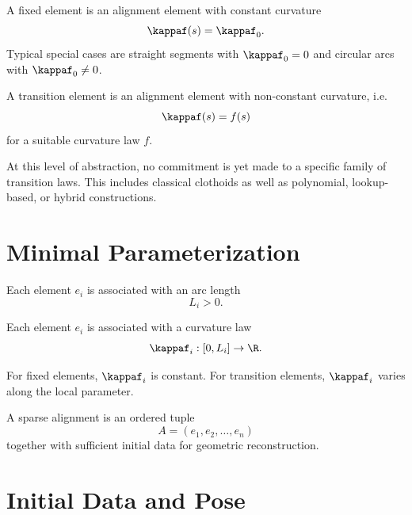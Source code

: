 \begin{definition}
A fixed element is an alignment element with constant curvature
\[
\kappaf(s)=\kappaf_0.
\]
Typical special cases are straight segments with $\kappaf_0=0$ and
circular arcs with $\kappaf_0\neq 0$.
\end{definition}

\begin{definition}
A transition element is an alignment element with non-constant
curvature, i.e.
\[
\kappaf(s)=f(s)
\]
for a suitable curvature law $f$.
\end{definition}

\begin{remark}
At this level of abstraction, no commitment is yet made to a specific
family of transition laws.
This includes classical clothoids as well as polynomial, lookup-based,
or hybrid constructions.
\end{remark}


\section{Minimal Parameterization}

\begin{definition}
Each element $e_i$ is associated with an arc length
\[
L_i > 0.
\]
\end{definition}

\begin{definition}
Each element $e_i$ is associated with a curvature law
\[
\kappaf_i : [0,L_i] \to \R.
\]
\end{definition}

\begin{remark}
For fixed elements, $\kappaf_i$ is constant.
For transition elements, $\kappaf_i$ varies along the local parameter.
\end{remark}

\begin{definition}
A sparse alignment is an ordered tuple
\[
A=(e_1,e_2,\dots,e_n)
\]
together with sufficient initial data for geometric reconstruction.
\end{definition}

\section{Initial Data and Pose}


